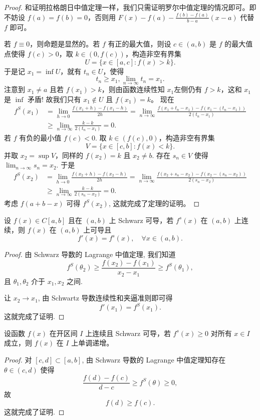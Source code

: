 \documentclass[lang=cn,10pt,thmcnt=section]{elegantbook}
\begin{document}
\begin{proof}
	和证明拉格朗日中值定理一样，我们只需证明罗尔中值定理的情况即可。即不妨设 $f(a) = f(b) = 0$，否则用 $F(x) - f(a) - \frac{f(b)-f(a)}{b-a}(x-a)$ 代替 $f$ 即可。
	
	若 $f \equiv 0$，则命题是显然的。若 $f$ 有正的最大值，则设 $c \in (a,b)$ 是 $f$ 的最大值点使得 $f(c)>0$，取 $k \in (0, f(c))$，构造非空有界集
	\[
	U = \{x \in [a,c] : f(x) > k\}.
	\]
	于是记 $x_1 = \inf U$，就有 $t_n \in U$，使得
	\[
	t_n \ge x_1, \lim_{n \to \infty} t_n = x_1.
	\]
	注意到 $x_1 \ne a$ 且若 $f(x_1) > k$，则由函数连续性知 $x_1$左侧仍有 $f>k$，这和 $x_1$ 是 $\inf$ 矛盾! 故我们只有 $x_1 \notin U$ 且 $f(x_1) = k$。
	现在
	\begin{align*}
	f^S(x_1) &= \lim_{h \to 0} \frac{f(x_1+h) - f(x_1-h)}{2h} = \lim_{n \to \infty} \frac{f(x_1+t_n-x_1) - f(x_1-(t_n-x_1))}{2(t_n-x_1)} \\
	&\ge \lim_{n \to \infty} \frac{k-k}{2(t_n-x_1)} = 0.
	\end{align*}
	若 $f$ 有负的最小值 $f(c)<0$. 取 $k \in (f(c), 0)$，构造非空有界集
	\[
	V = \{x \in [c,b]: f(x) < k\}.
	\]
	并取 $x_2 = \sup V$，同样的 $f(x_2)=k$ 且 $x_2 \ne b$. 存在 $s_n \in V$ 使得 $\lim_{n \to \infty} s_n = x_2$. 于是
	\begin{align*}
	f^S(x_2) &= \lim_{h \to 0} \frac{f(x_2+h) - f(x_2-h)}{2h} = \lim_{n \to \infty} \frac{f(x_2+s_n-x_2) - f(x_2-(s_n-x_2))}{2(s_n-x_2)} \\
	&\ge \lim_{n \to \infty} \frac{k-k}{2(s_n-x_2)} = 0.
	\end{align*}
	考虑 $f(a+b-x)$ 可得 $f^S(x_2)$, 这就完成了定理的证明。
	\end{proof}
	
\begin{theorem}
	设 \( f(x) \in C[a, b] \) 且在 \( (a, b) \) 上 Schwarz 可导，若 \( f^s(x) \) 在 \( (a, b) \) 上连续，则 \( f(x) \) 在 \( (a, b) \) 上可导且
\[ f'(x) = f^s(x), \quad \forall x \in (a, b). \]

\end{theorem}
\begin{proof}
	由 Schwarz 导数的 Lagrange 中值定理, 我们知道
	\[
	f^S(\theta_2) \ge \frac{f(x_2)-f(x_1)}{x_2-x_1} \ge f^S(\theta_1),
	\]
	且 $\theta_1, \theta_2$ 介于 $x_1, x_2$ 之间.
	
	让 $x_2 \to x_1$, 由 Schwartz 导数连续性和夹逼准则即可得
	\[
	f'(x_1) = f^S(x_1).
	\]
	这就完成了证明.
\end{proof}
\begin{theorem}
	设函数 \( f(x) \) 在开区间 \( I \) 上连续且 Schwarz 可导，若 \( f^s(x) \geq 0 \) 对所有 \( x \in I \) 成立，则 \( f(x) \) 在 \( I \) 上单调递增。
\end{theorem}
\begin{proof}
	对 $[c, d] \subset [a, b]$, 由 Schwarz 导数的 Lagrange 中值定理知存在 $\theta \in (c,d)$ 使得
\[
\frac{f(d)-f(c)}{d-c} \ge f^S(\theta) \ge 0,
\]
故
\[
f(d) \ge f(c).
\]
这就完成了证明.
\end{proof}
\end{document}
